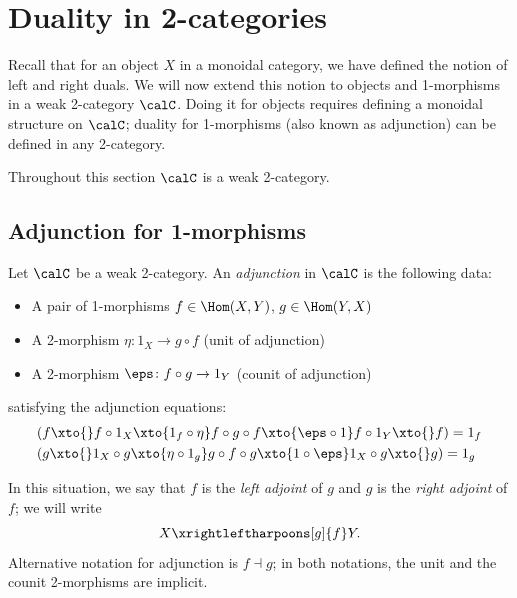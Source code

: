 \chapter{Duality in 2-categories}\label{c:duality-2cat}

Recall that for an object $X$ in a monoidal category, we have defined the
notion of left and right duals. We will now extend this notion to objects and
1-morphisms in a weak 2-category $\calC$. Doing it for objects requires
defining a monoidal structure on $\calC$; duality for 1-morphisms (also known as
adjunction) can be defined in any 2-category.

Throughout this section $\calC$ is a weak 2-category.
\section{Adjunction for 1-morphisms}\label{s:adjunction}
\begin{definition}\label{d:adjunction}
  Let $\calC$ be a weak 2-category. An \emph{adjunction} in $\calC$ is the
  following data:
  \begin{itemize}
    \item A pair of 1-morphisms $f\in\Hom(X,Y)$, $g\in \Hom(Y,X)$
    \item A 2-morphism $\eta\colon 1_X\to g\circ f$ (unit of adjunction)
    \item A 2-morphism $\eps\colon f\circ g\to 1_Y$ (counit of adjunction)
  \end{itemize}
  satisfying the adjunction equations:
  \begin{equation}\label{e:adjunction}
    \begin{aligned}
      &(f\xto{} f \circ 1_X \xto{1_f\circ \eta}
        f\circ g\circ f \xto{\eps \circ 1}
        f\circ 1_Y \xto{} f)=1_f\\
      &(g\xto{}  1_X \circ g \xto{\eta\circ 1_g}
        g\circ f\circ g \xto{1 \circ \eps}
        1_X\circ g \xto{} g)=1_g
    \end{aligned}
  \end{equation}

  In this situation, we say that $f$ is the \emph{left
  adjoint} of $g$ and $g$ is the \emph{right
  adjoint} of $f$; we will write $$
  X\xrightleftharpoons[g]{f}Y. $$ Alternative notation for adjunction is
  $f\dashv g$; in both notations, the unit and the counit 2-morphisms are
  implicit.
\end{definition}

